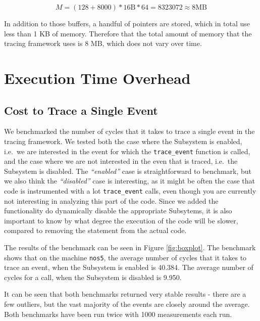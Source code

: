 \documentclass[a4paper,11pt,twoside]{report}
\begin{document}
\begin{equation}
	M = (128 + 8000) * 16 \textrm{B} * 64 = 8323072 \approx 8 \textrm{MB}
\end{equation}

In addition to those buffers, a handful of pointers are stored, which in total
use less than 1 KB of memory. Therefore that the total amount of memory that the
tracing framework uses is 8 MB, which does not vary over time.

\section{Execution Time Overhead}

\subsection{Cost to Trace a Single Event}

We benchmarked the number of cycles that it takes to trace a single event in the
tracing framework. We tested both the case where the Subsystem is enabled,
i.e.~we are interested in the event for which the \texttt{trace\_event} function
is called, and the case where we are not interested in the even that is traced,
i.e.~the Subsystem is disabled. The \emph{``enabled''} case is straightforward
to benchmark, but we also think the \emph{``disabled''} case is interesting, as
it might be often the case that code is instrumented with a lot
\texttt{trace\_event} calls, even though you are currently not interesting in
analyzing this part of the code. Since we added the functionality do dynamically
disable the appropriate Subsytems, it is also important to know by what degree
the execution of the code will be slower, compared to removing the statement
from the actual code.

The results of the benchmark can be seen in Figure \ref{fig:boxplot}. The
benchmark shows that on the machine \texttt{nos5}, the average number of cycles
that it takes to trace an event, when the Subsystem is enabled is 40.384. The
average number of cycles for a call, when the Subsystem is disabled is 9.950.

It can be seen that both benchmarks returned very stable results - there are a
few outliers, but the vast majority of the events are closely around the
average. Both benchmarks have been run twice with 1000 measurements each run.
\end{document}
